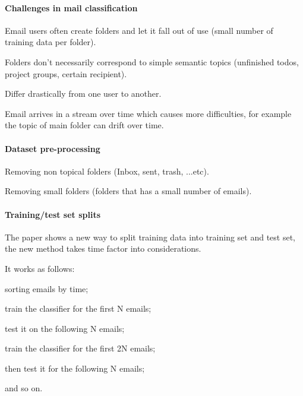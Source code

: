 \documentclass[12pt]{article}
\newenvironment{my_itemize}
{\begin{itemize}
  \setlength{\itemsep}{0cm}
  \setlength{\parskip}{0cm}}
{\end{itemize}}
\begin{document}
\paragraph{Challenges in mail classification}
\begin{my_itemize}
  \item Email users often create folders and let it fall out of use 
	(small number of training data per folder).
  \item Folders don't necessarily correspond to simple semantic topics 
	(unfinished todos, project groups, certain recipient).
  \item Differ drastically from one user to another.
  \item Email arrives in a stream over time which causes more difficulties, 
	for example the topic of main folder can drift over time.
\end{my_itemize}


\paragraph{Dataset pre-processing}
\begin{my_itemize}
    \item Removing non topical folders (Inbox, sent, trash, ...etc).
    \item Removing small folders (folders that has a small number of emails).
\end{my_itemize}

\paragraph{Training/test set splits}
\begin{my_itemize}
    \item The paper shows a new way to split training data into training set 
	  and test set, the new method takes time factor into considerations.
    \item It works as follows:
    \begin{my_itemize}
        \item sorting emails by time;
        \item train the classifier for the first N emails;
        \item test it on the following N emails;
        \item train the classifier for the first 2N emails;
        \item then test it for the following N emails;
        \item and so on.
    \end{my_itemize}
\end{my_itemize}
\end{document}
